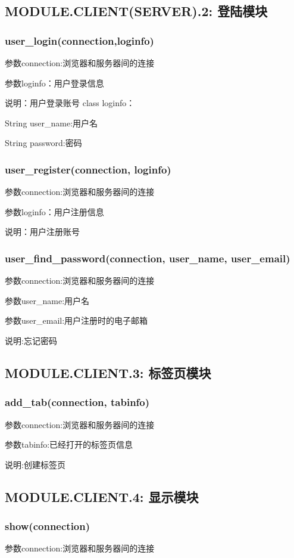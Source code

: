 \subsection{MODULE.CLIENT(SERVER).2: 登陆模块}

\subsubsection{user\_login(connection,loginfo)}
参数connection:浏览器和服务器间的连接

参数loginfo：用户登录信息

说明：用户登录账号
class loginfo：

String user\_name:用户名

String password:密码
\subsubsection{user\_register(connection, loginfo)}
参数connection:浏览器和服务器间的连接

参数loginfo：用户注册信息

说明：用户注册账号
\subsubsection{user\_find\_password(connection, user\_name, user\_email)}
参数connection:浏览器和服务器间的连接

参数user\_name:用户名

参数user\_email:用户注册时的电子邮箱

说明:忘记密码
\subsection{MODULE.CLIENT.3: 标签页模块}

\subsubsection{add\_tab(connection, tabinfo)}
参数connection:浏览器和服务器间的连接

参数tabinfo:已经打开的标签页信息

说明:创建标签页
\subsection{MODULE.CLIENT.4: 显示模块}

\subsubsection{show(connection)}
参数connection:浏览器和服务器间的连接

